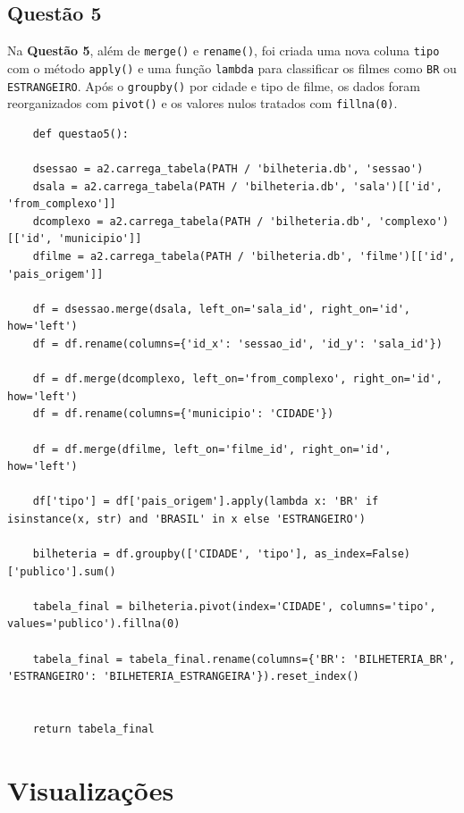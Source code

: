 \documentclass{article}
\begin{document}
\subsection*{Questão 5}
\linespread{1.5}
Na \textbf{Questão 5}, além de \texttt{merge()} e \texttt{rename()}, foi criada uma nova coluna \texttt{tipo} com o método \texttt{apply()} e uma função \texttt{lambda} para classificar os filmes como \texttt{BR} ou \texttt{ESTRANGEIRO}. Após o \texttt{groupby()} por cidade e tipo de filme, os dados foram reorganizados com \texttt{pivot()} e os valores nulos tratados com \texttt{fillna(0)}.
\linespread{1}
\begin{lstlisting}
    def questao5():
    
    dsessao = a2.carrega_tabela(PATH / 'bilheteria.db', 'sessao')
    dsala = a2.carrega_tabela(PATH / 'bilheteria.db', 'sala')[['id', 'from_complexo']]
    dcomplexo = a2.carrega_tabela(PATH / 'bilheteria.db', 'complexo')[['id', 'municipio']]
    dfilme = a2.carrega_tabela(PATH / 'bilheteria.db', 'filme')[['id', 'pais_origem']]

    df = dsessao.merge(dsala, left_on='sala_id', right_on='id', how='left')
    df = df.rename(columns={'id_x': 'sessao_id', 'id_y': 'sala_id'})

    df = df.merge(dcomplexo, left_on='from_complexo', right_on='id', how='left')
    df = df.rename(columns={'municipio': 'CIDADE'})

    df = df.merge(dfilme, left_on='filme_id', right_on='id', how='left')

    df['tipo'] = df['pais_origem'].apply(lambda x: 'BR' if isinstance(x, str) and 'BRASIL' in x else 'ESTRANGEIRO')

    bilheteria = df.groupby(['CIDADE', 'tipo'], as_index=False)['publico'].sum()

    tabela_final = bilheteria.pivot(index='CIDADE', columns='tipo', values='publico').fillna(0)

    tabela_final = tabela_final.rename(columns={'BR': 'BILHETERIA_BR', 'ESTRANGEIRO': 'BILHETERIA_ESTRANGEIRA'}).reset_index()
    

    return tabela_final

\end{lstlisting}
\pagebreak
\section{Visualizações}
\end{document}
